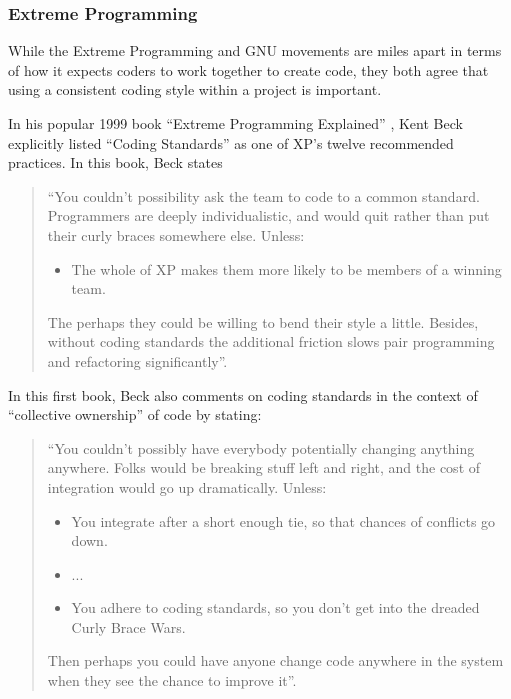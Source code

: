 %
\subsubsection{Extreme Programming}
%

While the Extreme Programming and GNU movements are miles apart in terms of
how it expects coders to work together to create code, they both agree that
using a consistent coding style within a project is important.

In his popular 1999 book ``Extreme Programming Explained''
{}\cite{ExtremeProgrammingExplained99}, Kent Beck explicitly listed ``Coding
Standards'' as one of XP's twelve recommended practices.  In this book, Beck
states

\begin{quote}

``You couldn't possibility ask the team to code to a common standard.
Programmers are deeply individualistic, and would quit rather than put their
curly braces somewhere else. Unless:

\begin{itemize}

{}\item The whole of XP makes them more likely to be members of a winning
team.

\end{itemize}

The perhaps they could be willing to bend their style a little.  Besides,
without coding standards the additional friction slows pair programming and
refactoring significantly''.

\end{quote}

In this first book, Beck also comments on coding standards in the context of
``collective ownership'' of code by stating:

\begin{quote}

``You couldn't possibly have everybody potentially changing anything anywhere.
Folks would be breaking stuff left and right, and the cost of integration
would go up dramatically.  Unless:

\begin{itemize}

{}\item You integrate after a short enough tie, so that chances of conflicts
go down.

{}\item ...

{}\item You adhere to coding standards, so you don't get into the dreaded
Curly Brace Wars.

\end{itemize}

Then perhaps you could have anyone change code anywhere in the system when
they see the chance to improve it''.

\end{quote}

